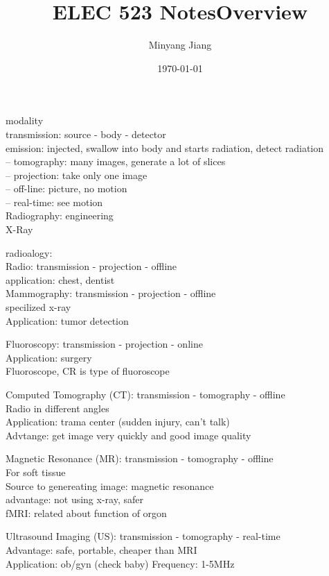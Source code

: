 \documentclass[letterpaper]{article}
\title{\huge ELEC 523 Notes}
\author{Minyang Jiang}
\date{\today}
\begin{document}
\maketitle
\title{Overview}
modality\\
transmission: source - body - detector\\
emission: injected, swallow into body and starts radiation, detect radiation\\

-- tomography: many images, generate a lot of slices\\
-- projection: take only one image\\
-- off-line: picture, no motion\\
-- real-time: see motion\\


Radiography: engineering\\
X-Ray

radioalogy: \\
Radio: transmission - projection - offline\\
application: chest, dentist\\

Mammography: transmission - projection - offline\\
specilized x-ray\\
Application: tumor detection

Fluoroscopy: transmission - projection - online\\
Application: surgery \\
Fluoroscope, CR is type of fluoroscope

Computed Tomography (CT): transmission - tomography - offline\\
Radio in different angles\\
Application: trama center (sudden injury, can't talk)\\
Advtange: get image very quickly and good image quality

Magnetic Resonance (MR): transmission - tomography - offline\\
For soft tissue\\
Source to genereating image: magnetic resonance\\
advantage: not using x-ray, safer\\
fMRI: related about function of orgon

Ultrasound Imaging (US): transmission - tomography - real-time\\
Advantage: safe, portable, cheaper than MRI\\
Application: ob/gyn (check baby)
Frequency: 1-5MHz





























			
			
\end{document}
